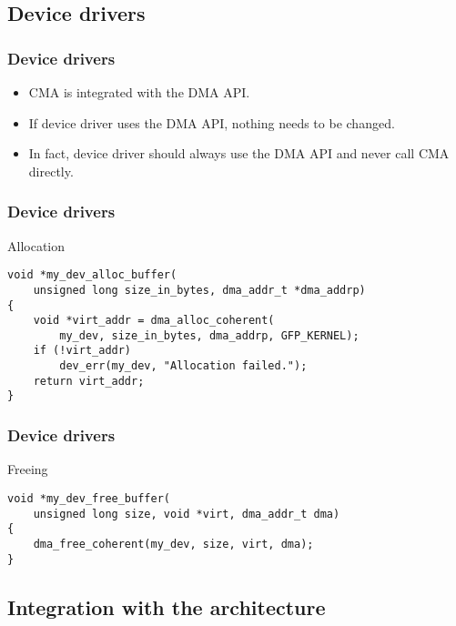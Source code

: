 
\subsection{Device drivers}

\begin{frame}
  \frametitle{Device drivers}

  \begin{itemize}
  \item CMA is integrated with the DMA API.
  \item If device driver uses the DMA API, nothing needs to be changed.
  \item In fact, device driver should always use the DMA API and never
    call CMA directly.
  \end{itemize}
\end{frame}

\begin{frame}[fragile]
  \frametitle{Device drivers}

  \begin{block}{Allocation}
\begin{lstlisting}
void *my_dev_alloc_buffer(
    unsigned long size_in_bytes, dma_addr_t *dma_addrp)
{
    void *virt_addr = dma_alloc_coherent(
        my_dev, size_in_bytes, dma_addrp, GFP_KERNEL);
    if (!virt_addr)
        dev_err(my_dev, "Allocation failed.");
    return virt_addr;
}
\end{lstlisting}
  \end{block}

\end{frame}

\begin{frame}[fragile]
  \frametitle{Device drivers}

  \begin{block}{Freeing}
\begin{lstlisting}
void *my_dev_free_buffer(
    unsigned long size, void *virt, dma_addr_t dma)
{
    dma_free_coherent(my_dev, size, virt, dma);
}
\end{lstlisting}
  \end{block}
\end{frame}

\subsection{Integration with the architecture}

